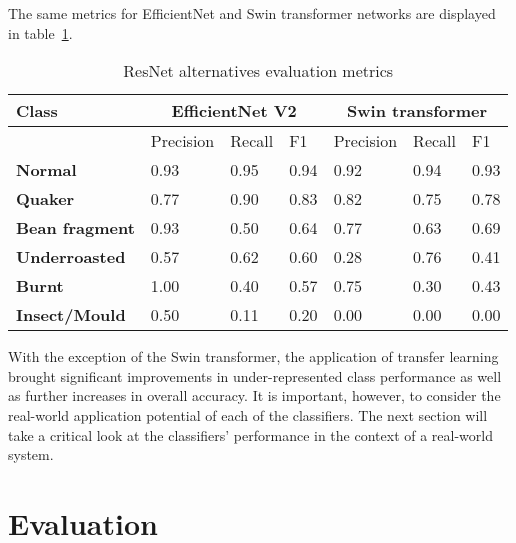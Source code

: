 The same metrics for EfficientNet and Swin transformer networks are displayed in table~\ref{tab:transfer-results-2}.

\begin{table}
    \centering
    \begin{tabular}{*7l}
        \toprule
        \textbf{Class} & \multicolumn{3}{c}{EfficientNet V2} & \multicolumn{3}{c}{Swin transformer} \\
        \midrule
        {} & Precision & Recall & F1 & Precision & Recall & F1 \\
        \textbf{Normal} & 0.93 & 0.95 & 0.94 & 0.92 & 0.94 & 0.93  \\
        \textbf{Quaker} & 0.77 & 0.90 & 0.83 & 0.82 & 0.75 & 0.78 \\
        \textbf{Bean fragment} & 0.93 & 0.50 & 0.64 & 0.77 & 0.63 & 0.69 \\
        \textbf{Underroasted} & 0.57 & 0.62 & 0.60 & 0.28 & 0.76 & 0.41 \\
        \textbf{Burnt} & 1.00 & 0.40 & 0.57 & 0.75 & 0.30 & 0.43 \\
        \textbf{Insect/Mould} & 0.50 & 0.11 & 0.20 & 0.00 & 0.00 & 0.00  \\
        \bottomrule
    \end{tabular}
    \caption{ResNet alternatives evaluation metrics}
    \label{tab:transfer-results-2}
\end{table}
With the exception of the Swin transformer, the application of transfer learning brought significant improvements in
under-represented class performance as well as further increases in overall accuracy.
It is important, however, to consider the real-world application potential of each of the classifiers.
The next section will take a critical look at the classifiers' performance in the context of a real-world system.
\section{Evaluation}
\label{sec:evaluation}

